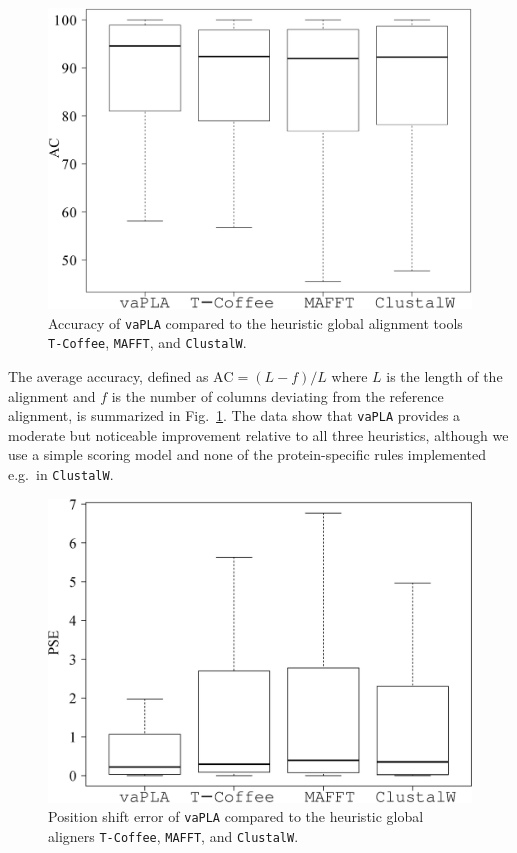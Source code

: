 \documentclass[a4paper,10pt]{article}
\newcommand{\TODO}[1]{\begingroup\color{red}#1\endgroup}
\newcommand{\SAFTWARE}{\texttt{vaPLA}} %
\begin{document}
\begin{figure}
  \begin{center}
    \includegraphics[width=1\columnwidth]{ac.eps}
  \end{center}
  \caption{Accuracy of \SAFTWARE{} compared to the heuristic global
    alignment tools \texttt{T-Coffee}, \texttt{MAFFT}, and
    \texttt{ClustalW}.}
    \label{fig:ac}
\end{figure}

The average accuracy, defined as $\mbox{AC}=(L-f)/L$ where $L$ is the
  length of the alignment and $f$ is the number of columns deviating from
  the reference alignment, is summarized in Fig.~\ref{fig:ac}. The data
  show that \SAFTWARE{} provides a moderate but noticeable improvement
  relative to all three heuristics, although we use a simple scoring model
  and none of the protein-specific rules implemented e.g.\ in
  \texttt{ClustalW}. 

\begin{figure}
  \begin{center}
    \includegraphics[width=1\columnwidth]{pse.eps}
  \end{center}
  \caption{Position shift error of \SAFTWARE{} compared to the heuristic
    global aligners \texttt{T-Coffee}, \texttt{MAFFT}, and
    \texttt{ClustalW}.}
  \label{fig:pse}
\end{figure}
\end{document}
